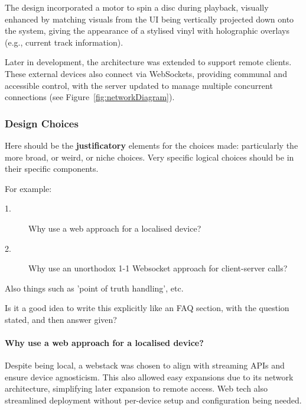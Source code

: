             The design incorporated a motor to spin a disc during playback, visually enhanced by matching visuals from the UI being vertically projected down onto the system, giving the appearance of a stylised vinyl with holographic overlays (e.g., current track information).
    
            Later in development, the architecture was extended to support remote clients. These external devices also connect via WebSockets, providing communal and accessible control, with the server updated to manage multiple concurrent connections (see Figure~\ref{fig:networkDiagram}).
        
            \subsubsection{Design Choices}
                \begin{temp}
                    Here should be the \textbf{justificatory} elements for the choices made: particularly the more broad, or weird, or niche choices. Very specific logical choices should be in their specific components.
                
                    For example:
                    \begin{description}
                        \item[1.] Why use a web approach for a localised device?
                        \item[2.] Why use an unorthodox 1-1 Websocket approach for client-server calls?
                    \end{description}
                    Also things such as 'point of truth handling', etc.
    
                    Is it a good idea to write this explicitly like an FAQ section, with the question stated, and then answer given?
                \end{temp}
    
                \paragraph{Why use a web approach for a localised device?} Despite being local, a webstack was chosen to align with streaming APIs and ensure device agnosticism. This also allowed easy expansions due to its network architecture, simplifying later expansion to remote access. Web tech also streamlined deployment without per-device setup and configuration being needed.
    
